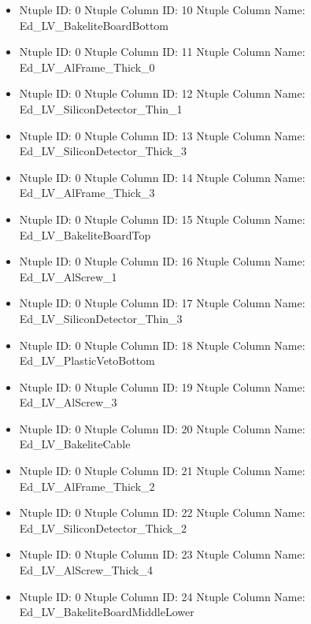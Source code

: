 \documentclass[8pt]{beamer}
\begin{document}
\begin{frame}
\begin{itemize}
        \item Ntuple ID: 0 Ntuple Column ID: 10 Ntuple Column Name: Ed\_LV\_BakeliteBoardBottom
        
        \item Ntuple ID: 0 Ntuple Column ID: 11 Ntuple Column Name: Ed\_LV\_AlFrame\_Thick\_0
        
        \item Ntuple ID: 0 Ntuple Column ID: 12 Ntuple Column Name: Ed\_LV\_SiliconDetector\_Thin\_1
        
        \item Ntuple ID: 0 Ntuple Column ID: 13 Ntuple Column Name: Ed\_LV\_SiliconDetector\_Thick\_3
        
        \item Ntuple ID: 0 Ntuple Column ID: 14 Ntuple Column Name: Ed\_LV\_AlFrame\_Thick\_3
        
        \item Ntuple ID: 0 Ntuple Column ID: 15 Ntuple Column Name: Ed\_LV\_BakeliteBoardTop
        
        \item Ntuple ID: 0 Ntuple Column ID: 16 Ntuple Column Name: Ed\_LV\_AlScrew\_1
        
        \item Ntuple ID: 0 Ntuple Column ID: 17 Ntuple Column Name: Ed\_LV\_SiliconDetector\_Thin\_3
        
        \item Ntuple ID: 0 Ntuple Column ID: 18 Ntuple Column Name: Ed\_LV\_PlasticVetoBottom
        
        \item Ntuple ID: 0 Ntuple Column ID: 19 Ntuple Column Name: Ed\_LV\_AlScrew\_3
        
        \item Ntuple ID: 0 Ntuple Column ID: 20 Ntuple Column Name: Ed\_LV\_BakeliteCable
        
        \item Ntuple ID: 0 Ntuple Column ID: 21 Ntuple Column Name: Ed\_LV\_AlFrame\_Thick\_2
        
        \item Ntuple ID: 0 Ntuple Column ID: 22 Ntuple Column Name: Ed\_LV\_SiliconDetector\_Thick\_2
        
        \item Ntuple ID: 0 Ntuple Column ID: 23 Ntuple Column Name: Ed\_LV\_AlScrew\_Thick\_4
        
        \item Ntuple ID: 0 Ntuple Column ID: 24 Ntuple Column Name: Ed\_LV\_BakeliteBoardMiddleLower
        

\end{itemize}
\end{frame}
\end{document}

